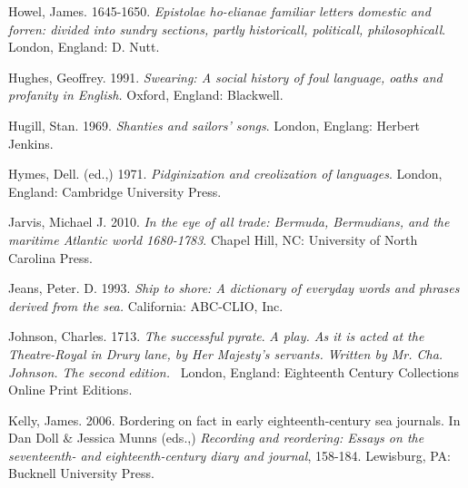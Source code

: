 \begin{styleStandard}
Howel, James. 1645-1650. \textit{Epistolae ho-elianae familiar letters domestic and forren: divided into sundry sections, partly historicall, politicall, philosophicall}. London, England: D. Nutt.
\end{styleStandard}

\begin{styleStandard}
Hughes, Geoffrey. 1991.\textit{ Swearing: A social history of foul language, oaths and profanity in English. }Oxford, England: Blackwell. 
\end{styleStandard}

\begin{styleStandard}
Hugill, Stan. 1969. \textit{Shanties and sailors’ songs}. London, Englang: Herbert Jenkins. 
\end{styleStandard}

\begin{styleStandard}
Hymes, Dell. (ed.,) 1971. \textit{Pidginization and creolization of languages}. London, England: Cambridge University Press.
\end{styleStandard}

\begin{styleStandard}
Jarvis, Michael J. 2010. \textit{In the eye of all trade: Bermuda, Bermudians, and the maritime Atlantic world 1680-1783}. Chapel Hill, NC: University of North Carolina Press.
\end{styleStandard}

\begin{styleStandard}
Jeans, Peter. D. 1993. \textit{Ship to shore: A dictionary of everyday words and phrases derived from the} \textit{sea.} California: ABC-CLIO, Inc.
\end{styleStandard}

\begin{styleStandard}
Johnson, Charles. 1713. \textit{The successful pyrate}. \textit{A play. As it is acted at the Theatre-Royal in Drury lane, by Her Majesty’s servants. Written by Mr. Cha. Johnson. The second edition.} \ London, England: Eighteenth Century Collections Online Print Editions. 
\end{styleStandard}

\begin{styleStandard}
Kelly, James. 2006. Bordering on fact in early eighteenth-century sea journals. In Dan Doll \& Jessica Munns (eds.,) \textit{Recording and reordering: Essays on the seventeenth- and eighteenth-century diary and journal}, 158-184. Lewisburg, PA: Bucknell University Press.\ \ 
\end{styleStandard}

